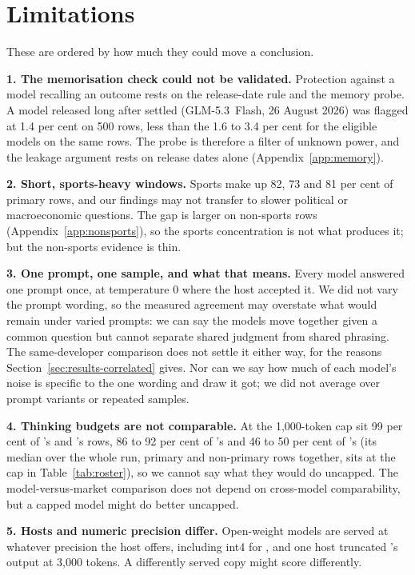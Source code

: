 \section{Limitations}
\label{sec:limitations}

These are ordered by how much they could move a conclusion.

\textbf{1. The memorisation check could not be validated.} Protection against a
model recalling an outcome rests on the release-date rule and the memory probe.
A model released long after \winA settled (\mbox{GLM-5.3 Flash}, 26 August
2026) was flagged at 1.4 per cent on 500 \winA rows, less than the 1.6 to 3.4
per cent for the eligible models on the same rows. The probe is therefore a
filter of unknown power, and the leakage argument rests on release dates alone
(Appendix~\ref{app:memory}).

\textbf{2. Short, sports-heavy windows.} Sports make up 82, 73 and 81 per cent
of primary rows, and our findings may not transfer to slower political or
macroeconomic questions. The gap is larger on non-sports rows
(Appendix~\ref{app:nonsports}), so the sports concentration is not what produces
it; but the non-sports evidence is thin.

\textbf{3. One prompt, one sample, and what that means.} Every model answered one
prompt once, at temperature 0 where the host accepted it. We did not vary the prompt
wording, so the measured agreement may overstate what would
remain under varied prompts: we can say the models move together given a common
question but cannot separate shared judgment from shared phrasing. The
same-developer comparison does not settle it either way, for the reasons
Section~\ref{sec:results-correlated} gives. Nor can we say how much of each
model's noise is specific to the one wording and draw it got; we did not average over
prompt variants or repeated samples.

\textbf{4. Thinking budgets are not comparable.} At the 1{,}000-token cap sit
99 per cent of \mKimiKTwoFive's and \mKimiKTwoSix's rows, 86 to 92 per cent of
\mDeepSeekVThreeTwo's and 46 to 50 per cent of \mDeepSeekVFourPro's (its median
over the whole run, primary and non-primary rows together, sits at the cap in
Table~\ref{tab:roster}), so we cannot say
what they would do uncapped. The model-versus-market comparison does not depend
on cross-model comparability, but a capped model might do better uncapped.

\textbf{5. Hosts and numeric precision differ.} Open-weight models are served at
whatever precision the host offers, including int4 for \mKimiKTwoFive, and one
host truncated \mDeepSeekVFourPro's output at 3{,}000 tokens. A differently
served copy might score differently.

